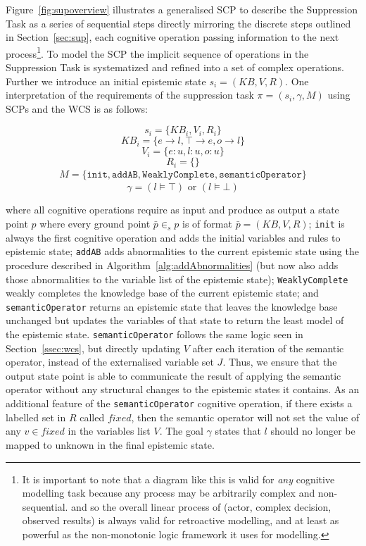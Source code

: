 Figure~\ref{fig:supoverview} illustrates a generalised SCP to describe the Suppression Task as a series of sequential steps directly mirroring the discrete steps outlined in Section~\ref{sec:sup}, each cognitive operation passing information to the next process\footnote{It is important to note that a diagram like this is valid for \textit{any} cognitive modelling task because any process may be arbitrarily complex and non-sequential. and so the overall linear process of (actor, complex decision, observed results) is always valid for retroactive modelling, and at least as powerful as the non-monotonic logic framework it uses for modelling.}. To model the SCP the implicit sequence of operations in the Suppression Task is systematized and refined into a set of complex operations. Further we introduce an initial epistemic state $s_i=(KB,V,R)$. One interpretation of the requirements of the suppression task $\pi=(s_i,\gamma,M)$ using SCPs and the WCS is as follows: 
 
 
 
 


\[s_i=\{KB_i, V_i, R_i\} \]
\[KB_i=\{e \rightarrow l, \top \rightarrow e, o \rightarrow l\} \]
\[V_i=\{e:u, l:u, o:u\} \]
\[R_i=\{\} \]
\[
\begin{split}
M= \{\texttt{init}, \texttt{addAB}, \texttt{WeaklyComplete}, \texttt{semanticOperator}\}
\end{split}
\]
\[\gamma = (l\models \top) \textrm{ or } (l \models \bot)\]


where all cognitive operations require as input and produce as output a state point $p$ where every ground point $\bar{p} \in_s p$ is of format $\bar{p}=(KB,V,R)$; \texttt{init} is always the first cognitive operation and adds the initial variables and rules to epistemic state; \texttt{addAB} adds abnormalities to the current epistemic state using the procedure described in Algorithm~\ref{alg:addAbnormalities} (but now also adds those abnormalities to the variable list of the epistemic state); \texttt{WeaklyComplete} weakly completes the knowledge base of the current epistemic state; and \texttt{semanticOperator} returns an epistemic state that leaves the knowledge base unchanged but updates the variables of that state to return the least model of the epistemic state. \texttt{semanticOperator} follows the same logic seen in Section~\ref{ssec:wcs}, but directly updating $V$ after each iteration of the semantic operator, instead of the externalised variable set $J$. Thus, we ensure that the output state point is able to communicate the result of applying the semantic operator without any structural changes to the epistemic states it contains. As an additional feature of the \texttt{semanticOperator} cognitive operation, if there exists a labelled set in $R$ called $fixed$, then the semantic operator will not set the value of any $v \in fixed$ in the variables list $V$. The goal $\gamma$ states that $l$ should no longer be mapped to unknown in the final epistemic state.



